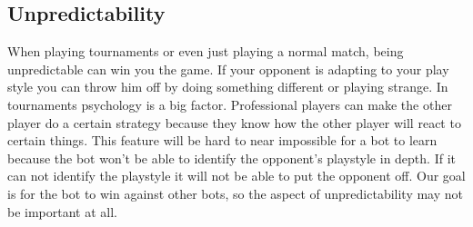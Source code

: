 	\subsection{Unpredictability}
		When playing tournaments or even just playing a normal match, being unpredictable can win you the game. 
		If your opponent is adapting to your play style you can throw him off by doing something different or playing strange.
		In tournaments psychology is a big factor. Professional players can make the other player do a certain strategy because they know 
		how the other player will react to certain things. This feature will be hard to near impossible for a bot to learn because the bot won't be able to 
		identify the opponent's playstyle in depth. 
		If it can not identify the playstyle it will not be able to put the opponent off. Our goal is for the bot 
		to win against other bots, so the aspect of unpredictability may not be important at all. 
